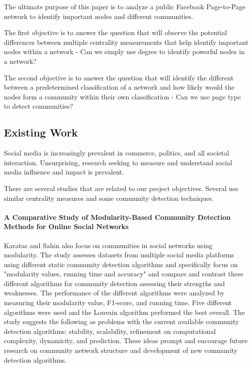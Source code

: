 \documentclass[11pt,twocolumn]{article}
\begin{document}
The ultimate purpose of this paper is to analyze a public Facebook Page-to-Page network to identify important nodes and different communities. 

The first objective is to answer the question that will observe the potential differences between multiple centrality measurements that help identify important nodes within a network - Can we simply use degree to identify powerful nodes in a network?


The second objective is to answer the question that will identify the different between a predetermined classification of a network and how likely would the nodes form a community within their own classification - Can we use page type to detect communities?




\subsection{Existing Work}

Social media is increasingly prevalent in commerce, politics, and all societal interaction. Unsurprising, research seeking to measure and understand social media influence and impact is prevalent. 

There are several studies that are related to our project objectives. Several use similar centrality measures and some community detection techniques. 

\paragraph{A Comparative Study of Modularity-Based Community Detection Methods for Online Social Networks \cite{modularity-based-community}}   
 
Karatas and Sahin also focus on communities in social networks using modularity. The study assesses datasets from multiple social media platforms using different static community detection algorithms and specifically focus on "modularity values, running time and accuracy" and compare and contrast these different algorithms for community detection assessing their strengths and weaknesses. The performance of the different algorithms were analyzed by measuring their modularity value, F1-score, and running time. Five different algorithms were used and the Louvain algorithm performed the best overall. The study suggests the following as problems with the current available community detection algorithms: stability, scalability, refinement on computational complexity, dynamicity, and prediction. These ideas prompt and encourage future research on community network structure and development of new community detection algorithms.
\end{document}
